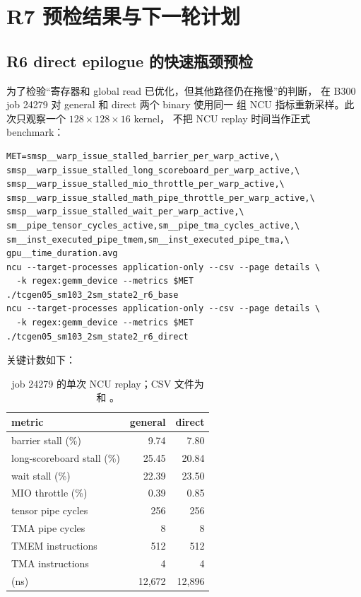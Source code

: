 \section{R7 预检结果与下一轮计划}

\subsection{R6 direct epilogue 的快速瓶颈预检}

为了检验“寄存器和 global read 已优化，但其他路径仍在拖慢”的判断，
在 B300 job 24279 对 general 和 direct 两个  binary 使用同一
组 NCU 指标重新采样。此次只观察一个 \(128\times128\times16\) kernel，
不把 NCU replay 时间当作正式 benchmark：

\begin{lstlisting}
MET=smsp__warp_issue_stalled_barrier_per_warp_active,\
smsp__warp_issue_stalled_long_scoreboard_per_warp_active,\
smsp__warp_issue_stalled_mio_throttle_per_warp_active,\
smsp__warp_issue_stalled_math_pipe_throttle_per_warp_active,\
smsp__warp_issue_stalled_wait_per_warp_active,\
sm__pipe_tensor_cycles_active,sm__pipe_tma_cycles_active,\
sm__inst_executed_pipe_tmem,sm__inst_executed_pipe_tma,\
gpu__time_duration.avg
ncu --target-processes application-only --csv --page details \
  -k regex:gemm_device --metrics $MET ./tcgen05_sm103_2sm_state2_r6_base
ncu --target-processes application-only --csv --page details \
  -k regex:gemm_device --metrics $MET ./tcgen05_sm103_2sm_state2_r6_direct
\end{lstlisting}

关键计数如下：

\begin{table}[htbp]
\centering
\small
\begin{tabular}{l r r}
\toprule
metric & general & direct \\
\midrule
barrier stall (\%) & 9.74 & 7.80 \\
long-scoreboard stall (\%) & 25.45 & 20.84 \\
wait stall (\%) & 22.39 & 23.50 \\
MIO throttle (\%) & 0.39 & 0.85 \\
tensor pipe cycles & 256 & 256 \\
TMA pipe cycles & 8 & 8 \\
TMEM instructions & 512 & 512 \\
TMA instructions & 4 & 4 \\
\code{gpu\_\_time\_\_duration} (ns) & 12,672 & 12,896 \\
\bottomrule
\end{tabular}
\caption{job 24279 的单次 NCU replay；CSV 文件为
 和
。}
\end{table}

